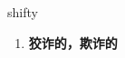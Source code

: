 
\begin{frame}
{\huge shifty}
\begin{center}
\begin{enumerate}\Large
  \item \textbf{狡诈的，欺诈的}
\end{enumerate}
\end{center}
\end{frame}
